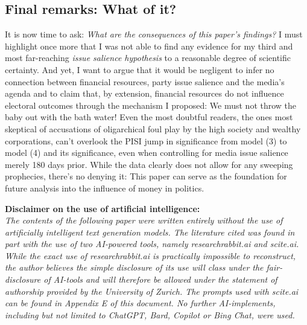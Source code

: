 \documentclass[11pt,a4paper]{article}
\begin{document}
\subsection{Final remarks: What of it?}
It is now time to ask: \textit{What are the consequences of this paper's findings?} I must highlight once more that I was not able to find any evidence for my third and most far-reaching \textit{issue salience hypothesis} to a reasonable degree of scientific certainty. And yet, I want to argue that it would be negligent to infer no connection between financial resources, party issue salience and the media's agenda and to claim that, by extension, financial resources do not influence electoral outcomes through the mechanism I proposed: We must not throw the baby out with the bath water! Even the most doubtful readers, the ones most skeptical of accusations of oligarchical foul play by the high society and wealthy corporations, can't overlook the PISI jump in significance from model (3) to model (4) and its significance, even when controlling for media issue salience merely 180 days prior. While the data clearly does not allow for any sweeping prophecies, there's no denying it: This paper can serve as the foundation for future analysis into the influence of money in politics.


\newpage

\printbibliography
{}

\newpage
{}
\vspace*{\fill}
\begin{center}
    \Large\textbf{Disclaimer on the use of artificial intelligence:}\\
    \normalsize
    \textit{
        The contents of the following paper were written entirely without the use of artificially intelligent text generation models. The literature cited was found in part with the use of two AI-powered tools, namely researchrabbit.ai and scite.ai. While the exact use of researchrabbit.ai is practically impossible to reconstruct, the author believes the simple disclosure of its use will class under the fair-disclosure of AI-tools and will therefore be allowed under the statement of authorship provided by the University of Zurich. The prompts used with scite.ai can be found in Appendix E of this document. No further AI-implements, including but not limited to ChatGPT, Bard, Copilot or Bing Chat, were used.
    }
\end{center}
\vspace*{\fill}
\end{document}
